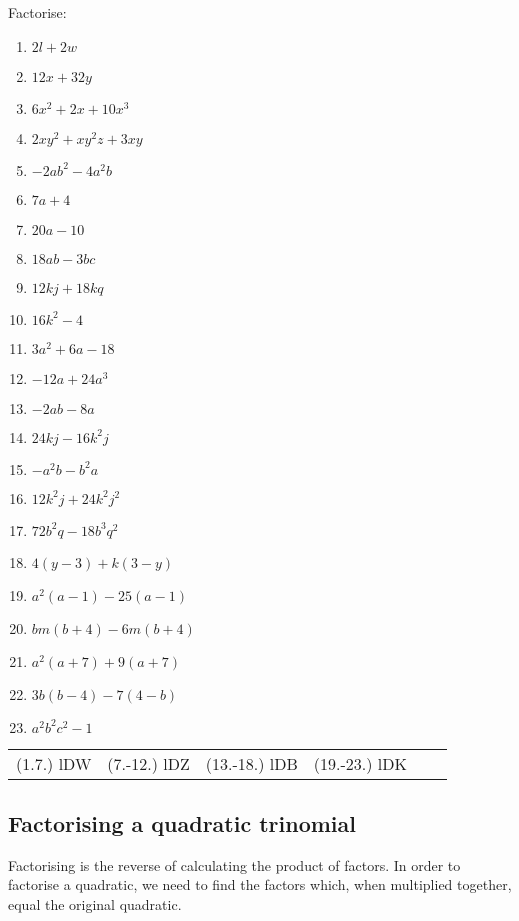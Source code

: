 \begin{exercises}{}{
Factorise:
\begin{multicols}{2}
\begin{enumerate}[itemsep=5pt, label=\textbf{\arabic*}. ] 
\item $2l+2w$
\item $12x+32y$
\item $6{x}^{2}+2x+10{x}^{3}$
\item $2x{y}^{2}+x{y}^{2}z+3xy$
\item $-2a{b}^{2}-4{a}^{2}b$
\item $7a+4$ 
\item $20a-10$ 
\item $18ab-3bc$
\item $12kj+18kq$ 
\item $16{k}^{2}-4$ 
\item $3{a}^{2}+6a-18$
\item $-12a+24a^3$ 
\item $-2ab-8a$ 
\item $24kj-16{k}^{2}j$
\item $-{a}^{2}b-{b}^{2}a$ 
\item $12{k}^{2}j+24{k}^{2}{j}^{2}$ 
\item $72{b}^{2}q-18{b}^{3}{q}^{2}$
\item $4(y-3)+k(3-y)$ 
\item $a^2(a-1)-25(a-1)$ 
\item $bm(b+4)-6m(b+4)$
\item ${a}^{2}(a+7)+9(a+7)$ 
\item $3b(b-4)-7(4-b)$ 
\item ${a}^{2}{b}^{2}{c}^{2}-1$
\end{enumerate}
\end{multicols}
\practiceinfo 
\par 
 \par \begin{tabular}[h]{cccccc}
 (1.7.) lDW  &  (7.-12.) lDZ  & (13.-18.) lDB  &  (19.-23.) lDK    \end{tabular}
}
\end{exercises}



\subsection* {Factorising a quadratic trinomial }

Factorising is the reverse of calculating the product of factors. In order to factorise a quadratic, we need to find the factors which, when multiplied together, equal the original quadratic.\par 

